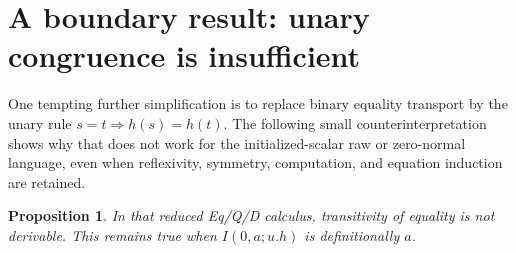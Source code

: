 \documentclass[11pt]{article}
\newtheorem{proposition}[theorem]{Proposition}
\theoremstyle{definition}\newtheorem{definition}[theorem]{Definition}
\begin{document}
\section{A boundary result: unary congruence is insufficient}

One tempting further simplification is to replace binary equality
transport by the unary rule $s=t\Rightarrow h(s)=h(t)$. The following
small counterinterpretation shows why that does not work for the
initialized-scalar raw or zero-normal language, even when reflexivity,
symmetry, computation, and equation induction are retained.

\begin{proposition}
In that reduced Eq/Q/D calculus, transitivity of equality is not
derivable. This remains true when $I(0,a;u.h)$ is definitionally $a$.
\end{proposition}
\end{document}
